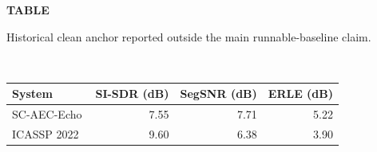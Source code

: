 \par\noindent
{}
\label{tab:historical-anchor}
\begin{center}
\textbf{TABLE \thetable}\\
\parbox{0.96\linewidth}{\centering Historical clean anchor reported outside the main runnable-baseline claim.}\\[0.5ex]
\scriptsize
\begin{tabular}{@{}lrrr@{}}
\hline
System & SI-SDR (dB) & SegSNR (dB) & ERLE (dB) \\
\hline
SC-AEC-Echo & 7.55 & 7.71 & 5.22 \\
ICASSP 2022~\cite{cutler2022aec} & 9.60 & 6.38 & 3.90 \\
\hline
\end{tabular}
\end{center}
\par\medskip
